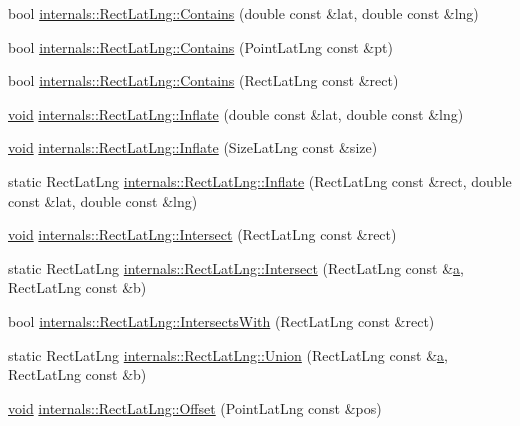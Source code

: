 \begin{DoxyCompactItemize}
\item 
bool \hyperlink{group___o_p_map_widget_ga08c25e5064c11d63c96a89619f027b89}{internals\-::\-Rect\-Lat\-Lng\-::\-Contains} (double const \&lat, double const \&lng)
\item 
bool \hyperlink{group___o_p_map_widget_ga15911b1ea5d85590ac05427410787b40}{internals\-::\-Rect\-Lat\-Lng\-::\-Contains} (\-Point\-Lat\-Lng const \&pt)
\item 
bool \hyperlink{group___o_p_map_widget_gafd896574ac80e5ee28f536db3a8391a2}{internals\-::\-Rect\-Lat\-Lng\-::\-Contains} (\-Rect\-Lat\-Lng const \&rect)
\item 
\hyperlink{group___u_a_v_objects_plugin_ga444cf2ff3f0ecbe028adce838d373f5c}{void} \hyperlink{group___o_p_map_widget_gaff9d1cc5fb1f00965fad7de448ee3aa3}{internals\-::\-Rect\-Lat\-Lng\-::\-Inflate} (double const \&lat, double const \&lng)
\item 
\hyperlink{group___u_a_v_objects_plugin_ga444cf2ff3f0ecbe028adce838d373f5c}{void} \hyperlink{group___o_p_map_widget_gab43105de3a7b0711e47f7e02e0359f2c}{internals\-::\-Rect\-Lat\-Lng\-::\-Inflate} (\-Size\-Lat\-Lng const \&size)
\item 
static \-Rect\-Lat\-Lng \hyperlink{group___o_p_map_widget_ga41e7a0b707e7e348e2d4f9b8aa3f2831}{internals\-::\-Rect\-Lat\-Lng\-::\-Inflate} (\-Rect\-Lat\-Lng const \&rect, double const \&lat, double const \&lng)
\item 
\hyperlink{group___u_a_v_objects_plugin_ga444cf2ff3f0ecbe028adce838d373f5c}{void} \hyperlink{group___o_p_map_widget_ga829f6c41bb7332b5c596f417157972a7}{internals\-::\-Rect\-Lat\-Lng\-::\-Intersect} (\-Rect\-Lat\-Lng const \&rect)
\item 
static \-Rect\-Lat\-Lng \hyperlink{group___o_p_map_widget_ga6590bcf87d4c6a72e570bcfcca89a5bf}{internals\-::\-Rect\-Lat\-Lng\-::\-Intersect} (\-Rect\-Lat\-Lng const \&\hyperlink{_o_p_plots_8m_ab6991d210d93a78cdbdf6de1889c1259}{a}, \-Rect\-Lat\-Lng const \&b)
\item 
bool \hyperlink{group___o_p_map_widget_ga3d1953efc67a3592589cff53c33e119a}{internals\-::\-Rect\-Lat\-Lng\-::\-Intersects\-With} (\-Rect\-Lat\-Lng const \&rect)
\item 
static \-Rect\-Lat\-Lng \hyperlink{group___o_p_map_widget_ga2b63b270f234d9f18a58415ff69b37e7}{internals\-::\-Rect\-Lat\-Lng\-::\-Union} (\-Rect\-Lat\-Lng const \&\hyperlink{_o_p_plots_8m_ab6991d210d93a78cdbdf6de1889c1259}{a}, \-Rect\-Lat\-Lng const \&b)
\item 
\hyperlink{group___u_a_v_objects_plugin_ga444cf2ff3f0ecbe028adce838d373f5c}{void} \hyperlink{group___o_p_map_widget_ga2bcd916c8be03d147e8d2e80315ff66b}{internals\-::\-Rect\-Lat\-Lng\-::\-Offset} (\-Point\-Lat\-Lng const \&pos)

\end{DoxyCompactItemize}
